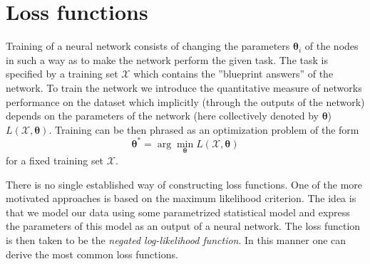 \documentclass[a5paper]{article}
\newcommand{\mc}[1]{\mathcal{#1}}
\begin{document}
\section{Loss functions}

Training of a neural network consists of changing the parameters \(\bm{\theta}_i\) of the nodes in
such a way as to make the network perform the given task. The task is specified by a training set
\(\mc{X}\) which contains the ''blueprint answers'' of the network. To train the network we
introduce the quantitative measure of networks performance on the dataset which implicitly (through
the outputs of the network) depends on the parameters of the network (here collectively denoted by
\(\bm{\theta}\)) \(L(\mc{X}, \bm{\theta})\). Training can be then phrased as an optimization problem
of the form
\[
   \bm{\theta}^* = \arg \min_{\bm{\theta}} L(\mc{X}, \bm{\theta})
\]
for a fixed training set \(\mc{X}\).

There is no single established way of constructing loss functions. One of the more motivated
approaches is based on the maximum likelihood criterion. The idea is that we model our data using
some parametrized statistical model and express the parameters of this model as an output of a
neural network. The loss function is then taken to be the \emph{negated log-likelihood function}. In
this manner one can derive the most common loss functions.
\end{document}
